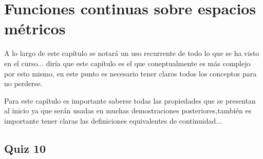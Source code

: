 
\section{Funciones continuas sobre espacios métricos}

A lo largo de este capítulo se notará un uso recurrente de todo lo que se ha visto en el curso... diría que este capítulo es el que coneptualmente es más complejo por esto mismo, en este punto es necesario tener claros todos los conceptos para no perderse.

\begin{note}
Para este capítulo es importante saberse todas las propiedades que se presentan al inicio ya que serán usadas en muchas demostraciones posteriores,también es importante tener claras las definiciones equivalentes de continuidad...
\end{note}

\subsection{Quiz 10}

